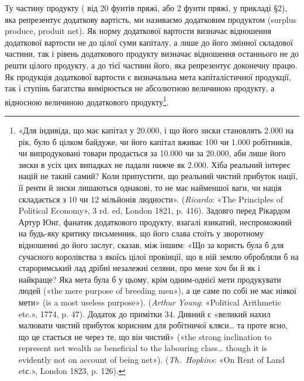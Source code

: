 Ту частину продукту ( від 20 фунтів пряжі, або 2 фунти пряжі, у
прикладі §2), яка репрезентує додаткову вартість, ми
називаємо додатковим продуктом (surplus produce, produit net). Як норму
додаткової вартости визначає відношення додаткової
вартости не до цілої суми капіталу, а лише до його змінної складової частини,
так і рівень додаткового продукту визначає відношення останнього не до решти
цілого продукту, а до тієї частини його, яка репрезентує доконечну працю.
Як продукція додаткової вартости є визначальна мета
капіталістичної продукції, так і ступінь багатства вимірюється не абсолютною
величиною продукту, а відносною величиною додаткового продукту\footnote{
«Для індивіда, що має капітал у \num{20.000}, і що його зиски
становлять \num{2.000} на рік, було б цілком байдуже, чи його
капітал вживає 100 чи \num{1.000} робітників, чи випродуковані товари продається
за \num{10.000} чи за \num{20.000}, аби лише
його зиски в усіх цих випадках не падали нижче як \num{2.000}. Хіба реальний інтерес націй не такий самий? Коли припустити, що
реальний чистий прибуток нації, її ренти й зиски лишаються однакові, то не має
найменшої ваги, чи нація складається з 10 чи
12 мільйонів людности». (\emph{Ricardo}: «The Principles of Political Economy»,
3 rd. ed, London 1821, p. 416). Задовго перед Рікардом Артур Юнґ, фанатик
додаткового продукту, взагалі язикатий, неспроможний
на будь-яку критику письменник, що його слава стоїть у зворотному відношенні
до його заслуг, сказав, між іншим: «Що за користь була б для сучасного
королівства з якоїсь цілої провінції, що в ній землю обробляли б на
староримський лад дрібні незалежні селяни, про мене хоч би
й як і найкраще? Яка мета була б у цьому, крім одним-однієї мети продукувати
людей («the mere purpose of breeding men»), а це саме по собі не має
ніякої мети» (is a most useless purpose»). (\emph{Arthur Young}: «Political
Arithmetic etc.», 1774, p. 47).
Додаток до примітки 34. Дивний є «великий нахил малювати чистий прибуток
корисним для робітничої кляси\dots{} та проте ясно, що це стається не через те,
що він чистий» («the strong inclination to
represent net wealth as beneficial to the labouring class\dots{} though it
is evidently not on account
of being net»). (\emph{Th.~Hopkins}: «On Rent of Land etс.», London 1823, p. 126).
}.
